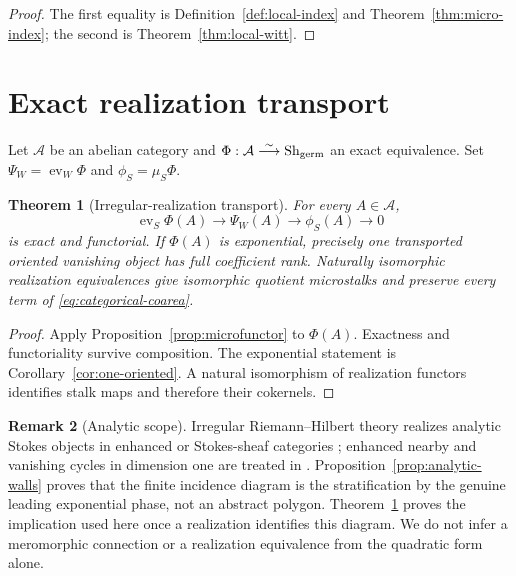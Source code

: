 \documentclass[11pt,a4paper]{amsart}
\theoremstyle{plain}
\newtheorem{theorem}{Theorem}[section]
\theoremstyle{definition}
\newtheorem{remark}[theorem]{Remark}
\newcommand{\Sh}{\operatorname{Sh}}
\begin{document}
\begin{proof}
The first equality is Definition~\ref{def:local-index} and Theorem~\ref{thm:micro-index}; the second
is Theorem~\ref{thm:local-witt}.
\end{proof}

\section{Exact realization transport}\label{sec:transport}

Let $\mathcal A$ be an abelian category and
$\Phi:\mathcal A\overset\sim\longrightarrow\Sh_{\rm germ}$ an exact equivalence.  Set
$\Psi_W=\operatorname{ev}_W\Phi$ and $\phi_S=\mu_S\Phi$.

\begin{theorem}[Irregular-realization transport]\label{thm:transport}
For every $A\in\mathcal A$,
\begin{equation}\label{eq:transport-exact}
 \operatorname{ev}_S\Phi(A)\longrightarrow\Psi_W(A)
 \longrightarrow\phi_S(A)\longrightarrow0
\end{equation}
is exact and functorial.  If $\Phi(A)$ is exponential, precisely one transported oriented
vanishing object has full coefficient rank.  Naturally isomorphic realization equivalences give
isomorphic quotient microstalks and preserve every term of \eqref{eq:categorical-coarea}.
\end{theorem}

\begin{proof}
Apply Proposition~\ref{prop:microfunctor} to $\Phi(A)$.  Exactness and functoriality survive
composition.  The exponential statement is Corollary~\ref{cor:one-oriented}.  A natural
isomorphism of realization functors identifies stalk maps and therefore their cokernels.
\end{proof}

\begin{remark}[Analytic scope]
Irregular Riemann--Hilbert theory realizes analytic Stokes objects in enhanced or Stokes-sheaf
categories \cite{Sabbah,DKRH}; enhanced nearby and vanishing cycles in dimension one are treated
in \cite{DKVanishing}.  Proposition~\ref{prop:analytic-walls} proves that the finite incidence
diagram is the stratification by the genuine leading exponential phase, not an abstract polygon.
Theorem~\ref{thm:transport} proves the implication used here once a realization identifies this
diagram.  We do not infer a meromorphic connection or a realization equivalence from the
quadratic form alone.
\end{remark}
\end{document}
